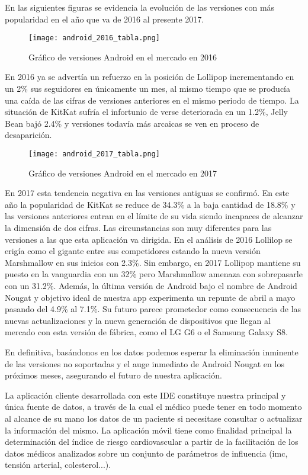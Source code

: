 \documentclass[11pt,spanish,
		listoftables,listoffigures]
		{tfgplantilla}
\begin{document}
En las siguientes figuras se evidencia la evolución de las versiones con más popularidad en el año que va de 2016 al presente 2017.

\begin{figure}[H]
\centering
\texttt{[image: android\_2016\_tabla.png]}
\caption{Gráfico de versiones Android en el mercado en 2016}
\end{figure}

En 2016 ya se advertía un refuerzo en la posición de Lollipop incrementando en un 2\%  sus seguidores en únicamente un mes, al mismo tiempo que se producía una caída de las cifras de versiones anteriores en el mismo periodo de tiempo. La situación de KitKat sufría el infortunio de verse deteriorada en un 1.2\%, Jelly Bean bajó 2.4\% y versiones todavía más arcaicas se ven en proceso de desaparición.

\newpage
\begin{figure}[H]
\centering
\texttt{[image: android\_2017\_tabla.png]}
\caption{Gráfico de versiones Android en el mercado en 2017}
\end{figure}

En 2017 esta tendencia negativa en las versiones antiguas se confirmó. En este año la popularidad de KitKat se reduce de 34.3\% a la baja cantidad de 18.8\% y las versiones anteriores entran en el límite de su vida siendo incapaces de alcanzar la dimensión de dos cifras. Las circunstancias son muy diferentes para las versiones a las que esta aplicación va dirigida. En el análisis de 2016 Lollilop se erigía como el gigante entre sus competidores estando la nueva versión Marshmallow en sus inicios con 2.3\%. Sin embargo, en 2017 Lollipop mantiene su puesto en la vanguardia con un 32\% pero Marshmallow amenaza con sobrepasarle con un 31.2\%. Además, la última versión de Android bajo el nombre de Android Nougat y objetivo ideal de nuestra app experimenta un repunte de abril a mayo pasando del 4.9\% al 7.1\%. Su futuro parece prometedor como consecuencia de las nuevas actualizaciones y la nueva generación de dispositivos que llegan al mercado con esta versión de fábrica, como el LG G6	 o el Samsung Galaxy S8.

En definitiva, basándonos en los datos podemos esperar la eliminación inminente de las versiones no soportadas y el auge inmediato de Android Nougat en los próximos meses, asegurando el futuro de nuestra aplicación.

La aplicación cliente desarrollada con este IDE constituye nuestra principal y única fuente de datos, a través de la cual el médico puede tener en todo momento al alcance de su mano los datos de un paciente si necesitase consultar o actualizar la información del mismo. La aplicación móvil tiene como finalidad principal la determinación del índice de riesgo cardiovascular a partir de la facilitación de los datos médicos analizados sobre un conjunto de parámetros de influencia (imc, tensión arterial, colesterol...).
\end{document}
